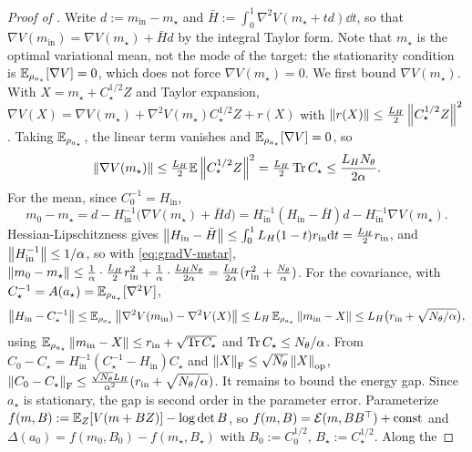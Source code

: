 \begin{proof}[Proof of ]
Write $d:=m_{\mathrm{in}}-m_\star$ and $\bar H:=\int_0^1\nabla^2V(m_\star+td)\dd t$, so that
$\nabla V(m_{\mathrm{in}})=\nabla V(m_\star)+\bar Hd$ by the integral Taylor form. Note that $m_\star$
is the optimal variational mean, not the mode of the target: the stationarity condition is
$\mathbb{E}_{\rho_{a_\star}}[\nabla V]=0$, which does not force $\nabla V(m_\star)=0$.
We first bound $\nabla V(m_\star)$. With $X=m_\star+C_\star^{1/2}Z$ and Taylor expansion,
$\nabla V(X)=\nabla V(m_\star)+\nabla^2V(m_\star)C_\star^{1/2}Z+r(X)$ with
$\left\lVert r(X)\right\rVert\leq\tfrac{L_H}2\left\lVert C_\star^{1/2}Z\right\rVert^2$. Taking $\mathbb{E}_{\rho_{a_\star}}$, the linear term
vanishes and $\mathbb{E}_{\rho_{a_\star}}[\nabla V]=0$, so
\begin{equation}
\label{eq:gradV-mstar}
    \left\lVert \nabla V(m_\star)\right\rVert\leq\tfrac{L_H}2\mathbb{E}\left\lVert C_\star^{1/2}Z\right\rVert^2=\tfrac{L_H}2\operatorname{Tr} C_\star\leq\frac{L_H N_\theta}{2\alpha}.
\end{equation}
For the mean, since $C_0^{-1}=H_{\mathrm{in}}$,
\[
    m_0-m_\star=d-H_{\mathrm{in}}^{-1}\bigl(\nabla V(m_\star)+\bar Hd\bigr)
    =H_{\mathrm{in}}^{-1}(H_{\mathrm{in}}-\bar H)d-H_{\mathrm{in}}^{-1}\nabla V(m_\star).
\]
Hessian-Lipschitzness gives $\left\lVert H_{\mathrm{in}}-\bar H\right\rVert\leq\int_0^1L_H(1-t)r_{\mathrm{in}}\mathrm{d} t=\tfrac{L_H}2r_{\mathrm{in}}$,
and $\left\lVert H_{\mathrm{in}}^{-1}\right\rVert\leq1/\alpha$, so with \eqref{eq:gradV-mstar},
$\left\lVert m_0-m_\star\right\rVert\leq\tfrac1\alpha\cdot\tfrac{L_H}2r_{\mathrm{in}}^2+\tfrac1\alpha\cdot\tfrac{L_H N_\theta}{2\alpha}
=\tfrac{L_H}{2\alpha}(r_{\mathrm{in}}^2+\tfrac{N_\theta}\alpha)$.
For the covariance, with $C_\star^{-1}=A(a_\star)=\mathbb{E}_{\rho_{a_\star}}[\nabla^2V]$,
\[
    \left\lVert H_{\mathrm{in}}-C_\star^{-1}\right\rVert\leq\mathbb{E}_{\rho_{a_\star}}\left\lVert \nabla^2V(m_{\mathrm{in}})-\nabla^2V(X)\right\rVert
    \leq L_H\,\mathbb{E}_{\rho_{a_\star}}\left\lVert m_{\mathrm{in}}-X\right\rVert\leq L_H\bigl(r_{\mathrm{in}}+\sqrt{N_\theta/\alpha}\bigr),
\]
using $\mathbb{E}_{\rho_{a_\star}}\left\lVert m_{\mathrm{in}}-X\right\rVert\leq r_{\mathrm{in}}+\sqrt{\operatorname{Tr} C_\star}$ and
$\operatorname{Tr} C_\star\leq N_\theta/\alpha$. From
$C_0-C_\star=H_{\mathrm{in}}^{-1}(C_\star^{-1}-H_{\mathrm{in}})C_\star$ and
$\left\lVert X\right\rVert_{\mathrm{F}}\leq\sqrt{N_\theta}\left\lVert X\right\rVert_{\mathrm{op}}$,
$\left\lVert C_0-C_\star\right\rVert_{\mathrm{F}}\leq\tfrac{\sqrt{N_\theta}L_H}{\alpha^2}(r_{\mathrm{in}}+\sqrt{N_\theta/\alpha})$.
It remains to bound the energy gap. Since $a_\star$ is stationary, the gap is second order in the
parameter error.
Parameterize $f(m,B):=\mathbb{E}_Z[V(m+BZ)]-\log\det B$, so $f(m,B)=\mathcal{E}(m,BB^\top)+\text{const}$ and
$\Delta(a_0)=f(m_0,B_0)-f(m_\star,B_\star)$ with $B_0:=C_0^{1/2}$, $B_\star:=C_\star^{1/2}$. Along the

\end{proof}
